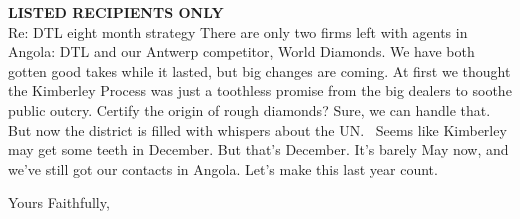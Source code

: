 \documentclass[12pt]{letter}
\begin{document}
\begin{letter}{{\bf LISTED RECIPIENTS ONLY}\\ \vspace{0.25in} Re: DTL eight month strategy}
There are only two firms left with agents in Angola:  DTL and our Antwerp competitor, World Diamonds.  We have both gotten good takes while it lasted, but big changes are coming.  At first we thought the Kimberley Process was just a toothless promise from the big dealers to soothe public outcry.  Certify the origin of rough diamonds?  Sure, we can handle that.  But now the district is filled with whispers about the UN. \ Seems like Kimberley may get some teeth in December.  But that's December.  It's barely May now, and we've still got our contacts in Angola.  Let's make this last year count.


\closing{Yours Faithfully,}



\end{letter}
\end{document}
